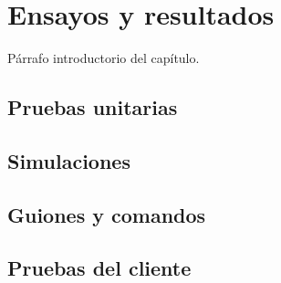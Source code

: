 
\chapter{Ensayos y resultados} %

\label{Chapter4} %


Párrafo introductorio del capítulo.

\section{Pruebas unitarias}

\section{Simulaciones}

\section{Guiones y comandos}

\section{Pruebas del cliente}
